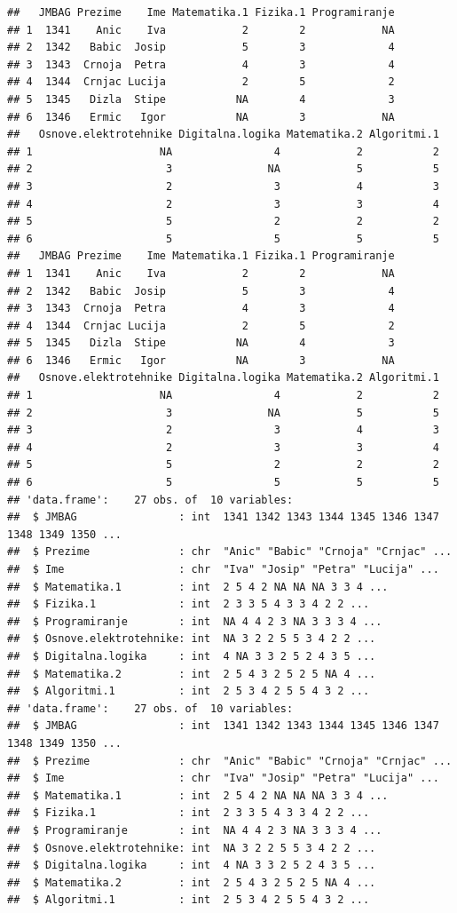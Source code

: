 \documentclass[]{book}
\theoremstyle{definition}
\theoremstyle{definition}
\theoremstyle{definition}
\theoremstyle{remark}
\begin{document}
\begin{verbatim}
##   JMBAG Prezime    Ime Matematika.1 Fizika.1 Programiranje
## 1  1341    Anic    Iva            2        2            NA
## 2  1342   Babic  Josip            5        3             4
## 3  1343  Crnoja  Petra            4        3             4
## 4  1344  Crnjac Lucija            2        5             2
## 5  1345   Dizla  Stipe           NA        4             3
## 6  1346   Ermic   Igor           NA        3            NA
##   Osnove.elektrotehnike Digitalna.logika Matematika.2 Algoritmi.1
## 1                    NA                4            2           2
## 2                     3               NA            5           5
## 3                     2                3            4           3
## 4                     2                3            3           4
## 5                     5                2            2           2
## 6                     5                5            5           5
##   JMBAG Prezime    Ime Matematika.1 Fizika.1 Programiranje
## 1  1341    Anic    Iva            2        2            NA
## 2  1342   Babic  Josip            5        3             4
## 3  1343  Crnoja  Petra            4        3             4
## 4  1344  Crnjac Lucija            2        5             2
## 5  1345   Dizla  Stipe           NA        4             3
## 6  1346   Ermic   Igor           NA        3            NA
##   Osnove.elektrotehnike Digitalna.logika Matematika.2 Algoritmi.1
## 1                    NA                4            2           2
## 2                     3               NA            5           5
## 3                     2                3            4           3
## 4                     2                3            3           4
## 5                     5                2            2           2
## 6                     5                5            5           5
## 'data.frame':    27 obs. of  10 variables:
##  $ JMBAG                : int  1341 1342 1343 1344 1345 1346 1347 1348 1349 1350 ...
##  $ Prezime              : chr  "Anic" "Babic" "Crnoja" "Crnjac" ...
##  $ Ime                  : chr  "Iva" "Josip" "Petra" "Lucija" ...
##  $ Matematika.1         : int  2 5 4 2 NA NA NA 3 3 4 ...
##  $ Fizika.1             : int  2 3 3 5 4 3 3 4 2 2 ...
##  $ Programiranje        : int  NA 4 4 2 3 NA 3 3 3 4 ...
##  $ Osnove.elektrotehnike: int  NA 3 2 2 5 5 3 4 2 2 ...
##  $ Digitalna.logika     : int  4 NA 3 3 2 5 2 4 3 5 ...
##  $ Matematika.2         : int  2 5 4 3 2 5 2 5 NA 4 ...
##  $ Algoritmi.1          : int  2 5 3 4 2 5 5 4 3 2 ...
## 'data.frame':    27 obs. of  10 variables:
##  $ JMBAG                : int  1341 1342 1343 1344 1345 1346 1347 1348 1349 1350 ...
##  $ Prezime              : chr  "Anic" "Babic" "Crnoja" "Crnjac" ...
##  $ Ime                  : chr  "Iva" "Josip" "Petra" "Lucija" ...
##  $ Matematika.1         : int  2 5 4 2 NA NA NA 3 3 4 ...
##  $ Fizika.1             : int  2 3 3 5 4 3 3 4 2 2 ...
##  $ Programiranje        : int  NA 4 4 2 3 NA 3 3 3 4 ...
##  $ Osnove.elektrotehnike: int  NA 3 2 2 5 5 3 4 2 2 ...
##  $ Digitalna.logika     : int  4 NA 3 3 2 5 2 4 3 5 ...
##  $ Matematika.2         : int  2 5 4 3 2 5 2 5 NA 4 ...
##  $ Algoritmi.1          : int  2 5 3 4 2 5 5 4 3 2 ...
\end{verbatim}
\end{document}
